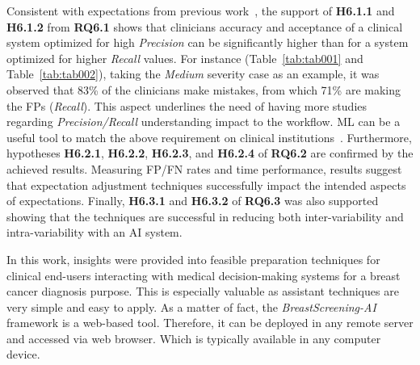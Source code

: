 Consistent with expectations from previous work~\cite{chaurasia2017novel, topol2019high}, the support of {\bf H6.1.1} and {\bf H6.1.2} from {\bf RQ6.1} shows that clinicians accuracy and acceptance of a clinical system optimized for high {\it Precision} can be significantly higher than for a system optimized for higher {\it Recall} values.
For instance (Table~\ref{tab:tab001} and Table~\ref{tab:tab002}), taking the {\it Medium} severity case as an example, it was observed that 83\% of the clinicians make mistakes, from which 71\% are making the \acp{FP} ({\it Recall}).
This aspect underlines the need of having more studies regarding {\it Precision/Recall} understanding impact to the workflow.
\ac{ML} can be a useful tool to match the above requirement  on clinical institutions~\cite{Dove:2017:UDI:3025453.3025739, Kocielnik:2019:YAI:3290605.3300641}.
Furthermore, hypotheses {\bf H6.2.1}, {\bf H6.2.2}, {\bf H6.2.3}, and {\bf H6.2.4} of {\bf RQ6.2} are confirmed by the achieved results.
Measuring \ac{FP}/\ac{FN} rates and time performance, results suggest that expectation adjustment techniques successfully impact the intended aspects of expectations.
Finally, {\bf H6.3.1} and {\bf H6.3.2} of {\bf RQ6.3} was also supported showing that the techniques are successful in reducing both inter-variability and intra-variability with an \ac{AI} system.

In this work, insights were provided into feasible preparation techniques for clinical end-users interacting with medical decision-making systems for a breast cancer diagnosis purpose.
This is especially valuable as assistant techniques are very simple and easy to apply.
As a matter of fact, the {\it BreastScreening-AI} framework is a web-based tool.
Therefore, it can be deployed in any remote server and accessed via web browser.
Which is typically available in any computer device.

